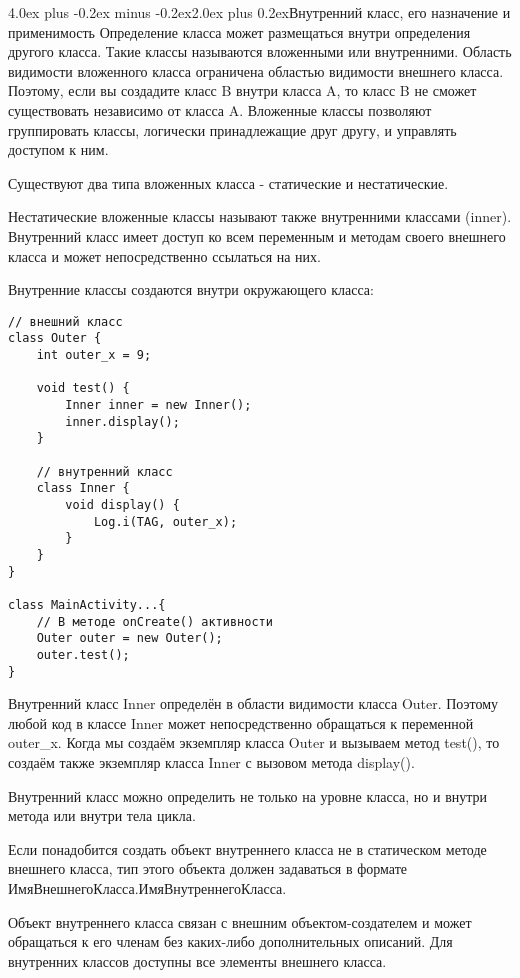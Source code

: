 \documentclass[12pt, a4paper]{book}%
\makeatletter
\renewcommand{\section}{\@startsection{section}{1}{1pt}%
{4.0ex plus -0.2ex minus -0.2ex}{2.0ex plus 0.2ex}{\centering\bf}}%
\makeatother
\begin{document}
{\section{Внутренний класс, его назначение и применимость}
Определение класса может размещаться внутри определения другого класса. Такие классы называются вложенными или внутренними. Область видимости вложенного класса ограничена областью видимости внешнего класса. Поэтому, если вы создадите класс B внутри класса A, то класс B не сможет существовать независимо от класса A. Вложенные классы позволяют группировать классы, логически принадлежащие друг другу, и управлять доступом к ним.

Существуют два типа вложенных класса - статические и нестатические.

Нестатические вложенные классы называют также внутренними классами (inner). Внутренний класс имеет доступ ко всем переменным и методам своего внешнего класса и может непосредственно ссылаться на них.

Внутренние классы создаются внутри окружающего класса:

\begin{lstlisting}
// внешний класс
class Outer {
    int outer_x = 9;
    
    void test() {
        Inner inner = new Inner();
        inner.display();
    }
    
    // внутренний класс
    class Inner {
        void display() {
            Log.i(TAG, outer_x);
        }
    }
}

class MainActivity...{
    // В методе onCreate() активности
    Outer outer = new Outer();
    outer.test();
}
\end{lstlisting}

Внутренний класс Inner определён в области видимости класса Outer. Поэтому любой код в классе Inner может непосредственно обращаться к переменной outer_x. Когда мы создаём экземпляр класса Outer и вызываем метод test(), то создаём также экземпляр класса Inner с вызовом метода display().

Внутренний класс можно определить не только на уровне класса, но и внутри метода или внутри тела цикла.

Если понадобится создать объект внутреннего класса не в статическом методе внешнего класса, тип этого объекта должен задаваться в формате ИмяВнешнегоКласса.ИмяВнутреннегоКласса.

Объект внутреннего класса связан с внешним объектом-создателем и может обращаться к его членам без каких-либо дополнительных описаний. Для внутренних классов доступны все элементы внешнего класса.

}
\end{document}
